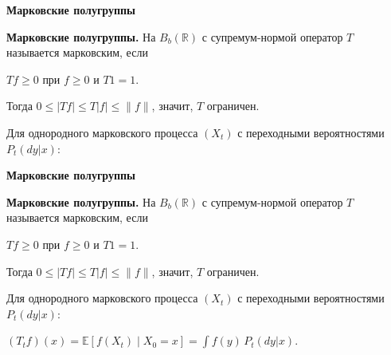 \documentclass[11pt]{article}
\newcommand{\R}{\mathbb{R}}
\newcommand{\E}{\mathbb{E}}
\begin{document}
\begin{center}
{\color{notaeYELLOW}\bfseries\fontsize{44}{52}\selectfont Марковские полугруппы}
\end{center}
\vspace*{\fill}
\begin{center}
\fontsize{36}{43}\selectfont
\parbox{\linewidth}{\centering\noindent \textbf{Марковские полугруппы.} На $B_b(\R)$ с супремум-нормой оператор $T$ называется марковским, если
\par}\vspace{0.4in}
\parbox{\linewidth}{\centering\noindent $Tf\ge0$ при $f\ge0$ и $T1=1$.
\par}\vspace{0.4in}
\parbox{\linewidth}{\centering\noindent Тогда $0\le|Tf|\le T|f|\le\|f\|$, значит, $T$ ограничен.
\par}\vspace{0.4in}
\parbox{\linewidth}{\centering\noindent Для однородного марковского процесса $(X_t)$ с переходными вероятностями $P_t(dy|x)$:
\par}\vspace{0.4in}
\end{center}
\vspace*{\fill}

\newpage

\begin{center}
{\color{notaeYELLOW}\bfseries\fontsize{44}{52}\selectfont Марковские полугруппы}
\end{center}
\vspace*{\fill}
\begin{center}
\fontsize{36}{43}\selectfont
\parbox{\linewidth}{\centering\noindent \textbf{Марковские полугруппы.} На $B_b(\R)$ с супремум-нормой оператор $T$ называется марковским, если
\par}\vspace{0.4in}
\parbox{\linewidth}{\centering\noindent $Tf\ge0$ при $f\ge0$ и $T1=1$.
\par}\vspace{0.4in}
\parbox{\linewidth}{\centering\noindent Тогда $0\le|Tf|\le T|f|\le\|f\|$, значит, $T$ ограничен.
\par}\vspace{0.4in}
\parbox{\linewidth}{\centering\noindent Для однородного марковского процесса $(X_t)$ с переходными вероятностями $P_t(dy|x)$:
\par}\vspace{0.4in}
\parbox{\linewidth}{\centering\noindent $(T_t f)(x)=\E[f(X_t)\mid X_0=x]=\int f(y)\,P_t(dy|x).$
\par}\vspace{0.4in}
\end{center}
\vspace*{\fill}
\end{document}
